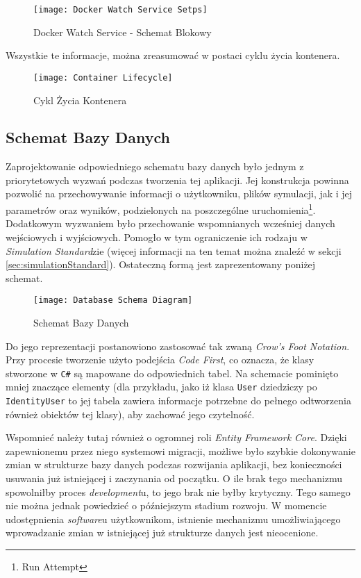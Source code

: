 \begin{figure}[H]
	\texttt{[image: Docker Watch Service Setps]}
	\caption{Docker Watch Service - Schemat Blokowy}
\end{figure}

\par Wszystkie te informacje, można zreasumować w postaci cyklu życia kontenera.

\begin{figure}[H]
	\texttt{[image: Container Lifecycle]}
	\caption{Cykl Życia Kontenera}
\end{figure}

\subsection{Schemat Bazy Danych}

\par Zaprojektowanie odpowiedniego schematu bazy danych było jednym z priorytetowych wyzwań podczas tworzenia tej aplikacji. Jej konstrukcja powinna pozwolić na przechowywanie informacji o użytkowniku, plików symulacji, jak i jej parametrów oraz wyników, podzielonych na poszczególne uruchomienia\footnote{Run Attempt}. Dodatkowym wyzwaniem było przechowanie wspomnianych wcześniej danych wejściowych i wyjściowych. Pomogło w tym ograniczenie ich rodzaju w \emph{Simulation Standard}zie (więcej informacji na ten temat można znaleźć w sekcji \ref{sec:simulationStandard}). Ostateczną formą jest zaprezentowany poniżej schemat.

\begin{figure}[H]
	\texttt{[image: Database Schema Diagram]}
	\caption{Schemat Bazy Danych}
\end{figure}

\par Do jego reprezentacji postanowiono zastosować tak zwaną \emph{Crow's Foot Notation}. Przy procesie tworzenie użyto podejścia \emph{Code First}, co oznacza, że klasy stworzone w \texttt{C\#} są mapowane do odpowiednich tabel. Na schemacie pominięto mniej znaczące elementy (dla przykładu, jako iż klasa \texttt{User} dziedziczy po \texttt{IdentityUser} to jej tabela zawiera informacje potrzebne do pełnego odtworzenia również obiektów tej klasy), aby zachować jego czytelność.

\par Wspomnieć należy tutaj również o ogromnej roli \emph{Entity Framework Core}. Dzięki zapewnionemu przez niego systemowi migracji, możliwe było szybkie dokonywanie zmian w strukturze bazy danych podczas rozwijania aplikacji, bez konieczności usuwania już istniejącej i zaczynania od początku. O ile brak tego mechanizmu spowolniłby proces \emph{development}u, to jego brak nie byłby krytyczny. Tego samego nie można jednak powiedzieć o późniejszym stadium rozwoju. W momencie udostępnienia \emph{software}u użytkownikom, istnienie mechanizmu umożliwiającego wprowadzanie zmian w istniejącej już strukturze danych jest nieocenione.

